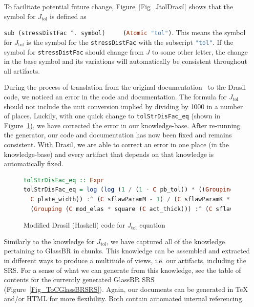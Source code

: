 \documentclass[sigconf]{acmart}
\newcommand{\jtol}{$J_{\mbox{tol}}$}
\newcommand{\inlHask}[1]{\lstinline[language=Haskell, columns=fullflexible,
  basicstyle=\ttfamily, showstringspaces=false, breaklines=true]{#1}}
\begin{document}
To facilitate potential future change, Figure~\ref{Fig_JtolDrasil} shows that
the symbol for \jtol{} is defined as {\inlHask{sub (stressDistFac ^. symbol)
    (Atomic "tol")}.  This means the symbol for \jtol{} is the symbol for the
  {\inlHask{stressDistFac}} with the subscript {\inlHask{"tol"}}.  If the symbol
  for {\inlHask{stressDistFac}} should change from $J$ to some other letter, the
  change in the base symbol and its variations will automatically be consistent
  throughout all artifacts.

During the process of translation from the original
documentation~\cite{SmithJegatheesanAndKelly2016} to the Drasil code, we noticed
an error in the code and documentation. The formula for \jtol{} should not
include the unit conversion implied by dividing by 1000 in a number of
places. Luckily, with one quick change to {\inlHask{tolStrDisFac_eq}} (shown in
Figure~\ref{Fig_JtolDrasil_fix}), we have corrected the error in our
knowledge-base. After re-running the generator, our code and documentation has
now been fixed and remains consistent.  With Drasil, we are able to correct an
error in one place (in the knowledge-base) and every artifact that depends on
that knowledge is automatically fixed.

\begin{figure}
\begin{lstlisting}[language=Haskell, frame=single, showstringspaces=false]
tolStrDisFac_eq :: Expr
tolStrDisFac_eq = log (log (1 / (1 - C pb_tol)) * ((Grouping (C plate_len * 
  C plate_width)) :^ (C sflawParamM - 1) / (C sflawParamK * 
  (Grouping (C mod_elas * square (C act_thick))) :^ (C sflawParamM) * (C loadDF))))
\end{lstlisting}
\caption{Modified Drasil (Haskell) code for \jtol{} equation}
\label{Fig_JtolDrasil_fix}
\end{figure}

Similarly to the knowledge for \jtol{}, we have captured all of the knowledge
pertaining to GlassBR in chunks.  This knowledge can be assembled and extracted
in different ways to produce a multitude of views, i.e. our artifacts, including
the SRS. For a sense of what we can generate from this knowledge, see the table
of contents for the currently generated GlassBR SRS
(Figure~\ref{Fig_ToCGlassBRSRS}). Again, our documents can be generated in TeX
and/or HTML for more flexibility. Both contain automated internal referencing.

}
\end{document}
